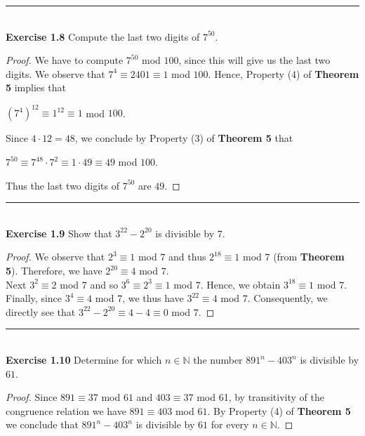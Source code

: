 \documentclass[a4paper]{article}
\begin{document}
\noindent\rule{12cm}{0.4pt}\\
\noindent \textbf{Exercise 1.8} Compute the last two digits of $7^{50}$.
\begin{proof}
We have to compute $7^{50}$ mod $100$, since this will give us the last two digits. We observe that $7^{4} \equiv 2401 \equiv 1$ mod $100$. Hence, Property (4) of \textbf{Theorem 5} implies that
\begin{center}
$(7^{4})^{12} \equiv 1^{12} \equiv 1$ mod $100$.
\end{center}
Since $4 \cdot 12 = 48$, we conclude by Property (3) of \textbf{Theorem 5} that
\begin{center}
$7^{50} \equiv 7^{48} \cdot 7^{2} \equiv 1 \cdot 49 \equiv 49$ mod $100$.
\end{center}
Thus the last two digits of $7^{50}$ are $49$.
\end{proof}



\noindent\rule{12cm}{0.4pt}\\
\noindent \textbf{Exercise 1.9} Show that $3^{22}-2^{20}$ is divisible by $7$.
\begin{proof}
We observe that $2^{3} \equiv 1$ mod $7$ and thus $2^{18} \equiv 1$ mod $7$ (from \textbf{Theorem 5}). Therefore, we have $2^{20} \equiv 4$ mod $7$.\\
Next $3^{2} \equiv 2$ mod $7$ and so $3^{6} \equiv 2^{3} \equiv 1$ mod $7$. Hence, we obtain $3^{18} \equiv 1$ mod $7$. Finally, since $3^{4} \equiv 4$ mod $7$, we thus have $3^{22} \equiv 4$ mod $7$. Consequently, we directly see that $3^{22} - 2^{20} \equiv 4 -4 \equiv 0$ mod $7$.
\end{proof}



\noindent\rule{12cm}{0.4pt}\\
\noindent \textbf{Exercise 1.10} Determine for which $n \in \mathbb{N}$ the number $891^n - 403^n$ is divisible by $61$.
\begin{proof}
Since $891 \equiv 37$ mod $61$ and $403 \equiv 37$ mod 61, by transitivity of the congruence relation we have $891 \equiv 403$ mod $61$. By Property (4) of \textbf{Theorem 5} we conclude that $891^{n}-403^{n}$ is divisible by $61$ for every $n \in \mathbb{N}$.
\end{proof}
\end{document}
